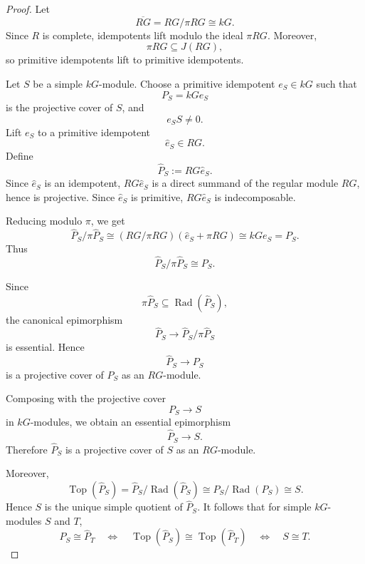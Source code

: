 \begin{proof}
    Let
    \[
        \overline{RG}=RG/\pi RG\cong kG.
    \]
    Since \(R\) is complete, idempotents lift modulo the ideal \(\pi RG\). Moreover,
    \[
        \pi RG\subseteq J(RG),
    \]
    so primitive idempotents lift to primitive idempotents.

    Let \(S\) be a simple \(kG\)-module. Choose a primitive idempotent
    \(e_S\in kG\) such that
    \[
        P_S=kG e_S
    \]
    is the projective cover of \(S\), and
    \[
        e_S S\neq 0.
    \]
    Lift \(e_S\) to a primitive idempotent
    \[
        \widehat e_S\in RG.
    \]
    Define
    \[
        \widehat P_S:=RG\widehat e_S.
    \]
    Since \(\widehat e_S\) is an idempotent, \(RG\widehat e_S\) is a direct summand
    of the regular module \(RG\), hence is projective. Since \(\widehat e_S\) is
    primitive, \(RG\widehat e_S\) is indecomposable.

    Reducing modulo \(\pi\), we get
    \[
        \widehat P_S/\pi\widehat P_S
        \cong
        (RG/\pi RG)(\widehat e_S+\pi RG)
        \cong
        kG e_S
        =
        P_S.
    \]
    Thus
    \[
        \widehat P_S/\pi\widehat P_S\cong P_S.
    \]

    Since
    \[
        \pi\widehat P_S\subseteq \operatorname{Rad}(\widehat P_S),
    \]
    the canonical epimorphism
    \[
        \widehat P_S\longrightarrow \widehat P_S/\pi\widehat P_S
    \]
    is essential. Hence
    \[
        \widehat P_S\longrightarrow P_S
    \]
    is a projective cover of \(P_S\) as an \(RG\)-module.

    Composing with the projective cover
    \[
        P_S\longrightarrow S
    \]
    in \(kG\)-modules, we obtain an essential epimorphism
    \[
        \widehat P_S\longrightarrow S.
    \]
    Therefore \(\widehat P_S\) is a projective cover of \(S\) as an \(RG\)-module.

    Moreover,
    \[
        \operatorname{Top}(\widehat P_S)
        =
        \widehat P_S/\operatorname{Rad}(\widehat P_S)
        \cong
        P_S/\operatorname{Rad}(P_S)
        \cong
        S.
    \]
    Hence \(S\) is the unique simple quotient of \(\widehat P_S\). It follows that
    for simple \(kG\)-modules \(S\) and \(T\),
    \[
        \widehat P_S\cong \widehat P_T
        \quad\Longleftrightarrow\quad
        \operatorname{Top}(\widehat P_S)\cong \operatorname{Top}(\widehat P_T)
        \quad\Longleftrightarrow\quad
        S\cong T.
    \]


\end{proof}
